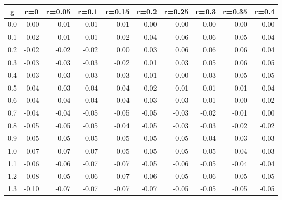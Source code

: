 %
\begin{table}[!tbp]
 \begin{center}
 \begin{tabular}{rrrrrrrrrr}\hline\hline
\multicolumn{1}{c}{g}&\multicolumn{1}{c}{r=0}&\multicolumn{1}{c}{r=0.05}&\multicolumn{1}{c}{r=0.1}&\multicolumn{1}{c}{r=0.15}&\multicolumn{1}{c}{r=0.2}&\multicolumn{1}{c}{r=0.25}&\multicolumn{1}{c}{r=0.3}&\multicolumn{1}{c}{r=0.35}&\multicolumn{1}{c}{r=0.4}\tabularnewline
\hline
0.0& 0.00&-0.01&-0.01&-0.01& 0.00& 0.00& 0.00& 0.00& 0.00\tabularnewline
0.1&-0.02&-0.01&-0.01& 0.02& 0.04& 0.06& 0.06& 0.05& 0.04\tabularnewline
0.2&-0.02&-0.02&-0.02& 0.00& 0.03& 0.06& 0.06& 0.06& 0.04\tabularnewline
0.3&-0.03&-0.03&-0.03&-0.02& 0.01& 0.03& 0.05& 0.06& 0.05\tabularnewline
0.4&-0.03&-0.03&-0.03&-0.03&-0.01& 0.00& 0.03& 0.05& 0.05\tabularnewline
0.5&-0.04&-0.03&-0.04&-0.04&-0.02&-0.01& 0.01& 0.01& 0.04\tabularnewline
0.6&-0.04&-0.04&-0.04&-0.04&-0.03&-0.03&-0.01& 0.00& 0.02\tabularnewline
0.7&-0.04&-0.04&-0.05&-0.05&-0.05&-0.03&-0.02&-0.01& 0.00\tabularnewline
0.8&-0.05&-0.05&-0.05&-0.04&-0.05&-0.03&-0.03&-0.02&-0.02\tabularnewline
0.9&-0.05&-0.05&-0.05&-0.05&-0.05&-0.05&-0.04&-0.03&-0.03\tabularnewline
1.0&-0.07&-0.07&-0.07&-0.05&-0.05&-0.05&-0.05&-0.04&-0.03\tabularnewline
1.1&-0.06&-0.06&-0.07&-0.07&-0.05&-0.06&-0.05&-0.04&-0.04\tabularnewline
1.2&-0.08&-0.05&-0.06&-0.07&-0.06&-0.05&-0.06&-0.05&-0.05\tabularnewline
1.3&-0.10&-0.07&-0.07&-0.07&-0.07&-0.05&-0.05&-0.05&-0.05\tabularnewline
\hline
\end{tabular}

\end{center}

\end{table}

